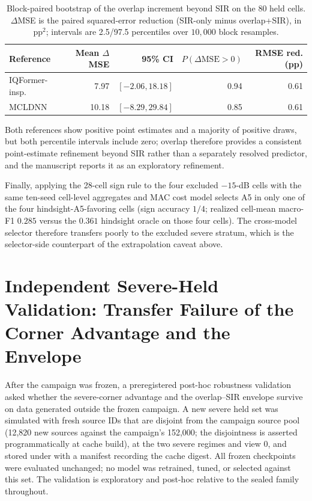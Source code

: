 \documentclass[letterpaper,onecolumn,11pt,journal]{IEEEtran}
\begin{document}
\begin{table}[t]
\centering
\caption{Block-paired bootstrap of the overlap increment beyond SIR on the
80 held cells. $\Delta$MSE is the paired squared-error reduction
(SIR-only minus overlap+SIR), in $\mathrm{pp}^2$; intervals are 2.5/97.5
percentiles over $10{,}000$ block resamples.}
\label{tab:bootpair}
\footnotesize
\setlength{\tabcolsep}{4pt}
\begin{tabular}{lrrrr}
\toprule
Reference & Mean $\Delta$MSE & 95\% CI & $P(\Delta\mathrm{MSE}>0)$ & RMSE red. (pp)\\
\midrule
IQFormer-insp. & 7.97 & $[-2.06, 18.18]$ & 0.94 & 0.61\\
MCLDNN & 10.18 & $[-8.29, 29.84]$ & 0.85 & 0.61\\
\bottomrule
\end{tabular}
\end{table}

Both references show positive point estimates and a majority of positive
draws, but both percentile intervals include zero; overlap therefore provides
a consistent point-estimate refinement beyond SIR rather than a separately
resolved predictor, and the manuscript reports it as an exploratory
refinement.

Finally, applying the 28-cell sign rule to the four excluded $-15$-dB cells
with the same ten-seed cell-level aggregates and MAC cost model selects A5
in only one of the four hindsight-A5-favoring cells (sign accuracy $1/4$;
realized cell-mean macro-F1 $0.285$ versus the $0.361$ hindsight oracle on
those four cells). The cross-model selector therefore transfers poorly to
the excluded severe stratum, which is the selector-side counterpart of the
extrapolation caveat above.

\section{Independent Severe-Held Validation: Transfer Failure of the Corner
Advantage and the Envelope}
After the campaign was frozen, a preregistered post-hoc robustness
validation asked whether the severe-corner advantage and the overlap--SIR
envelope survive on data generated outside the frozen campaign. A new severe
held set was simulated with fresh source IDs that are disjoint from the
campaign source pool (12,820 new sources against the campaign's 152,000;
the disjointness is asserted programmatically at cache build), at the two
severe regimes and view $0$, and stored under
 with a manifest recording the
cache digest. All frozen checkpoints were evaluated unchanged; no model was
retrained, tuned, or selected against this set. The validation is
exploratory and post-hoc relative to the sealed family throughout.
\end{document}
